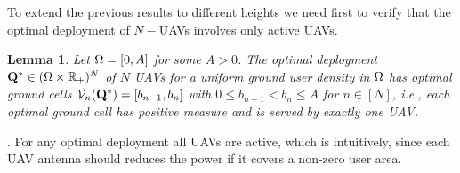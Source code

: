 \documentclass[smallabstract,smallcaptions]{dccpaper}
\newtheorem{lemma}{Lemma}
\newenvironment{remark}{\par\vspace{1.5ex}\noindent{\em Remark\/}.}{\par\vspace{1.5ex}}
\newif\ifproof\prooffalse %
\newcommand{\Vor}{\ensuremath{\mathcal{V}}}         %
\newcommand{\philippstart}{\color{black}}
\begin{document}
To extend the previous results to different heights we need first to verify that the optimal deployment of $N-$UAVs
involves only active UAVs. 
%
\philippstart
%
\begin{lemma}\label{lemma:allActive}
  Let $\Omega=[0,A]$ for some $A>0$. The optimal deployment $\mathbf Q^*\in(\Omega\times{\ensuremath{\mathbb R}}_+)^N$ of $N$ UAVs for a uniform ground
  user density in $\Omega$ has optimal ground cells $\Vor_n(\vQ^*)=[b_{n-1},b_n]$ with $0\leq b_{n-1}<b_n\leq A$ for
  $n\in[N]$, i.e., each optimal ground cell has positive measure and is served by exactly one UAV. 
\end{lemma}
%
\begin{remark}
  For any optimal deployment all UAVs are active, which is intuitively, since each UAV
  antenna should reduces the power if it covers a non-zero user area.
\end{remark}
%
\ifproof
\end{document}
